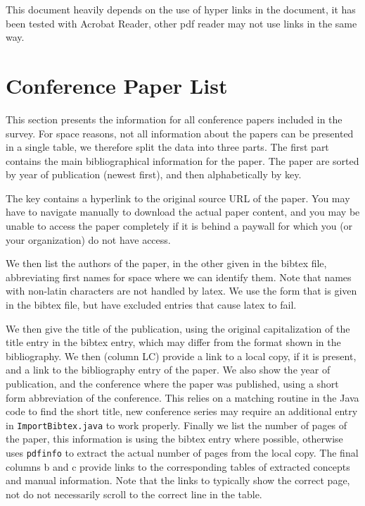 \documentclass[a4paper]{article}
\begin{document}
This document heavily depends on the use of hyper links in the document, it has been tested with Acrobat Reader, other pdf reader may not use links in the same way. 

\clearpage


\section{Conference Paper List}

This section presents the information for all conference papers included in the survey. For space reasons, not all information about the papers can be presented in a single table, we therefore split the data into three parts. The first part contains the main bibliographical information for the paper. The paper are sorted by year of publication (newest first), and then alphabetically by key. 

The key contains a hyperlink to the original source URL of the paper. You may have to navigate manually to download the actual paper content, and you may be unable to access the paper completely if it is behind a paywall for which you (or your organization) do not have access.

We then list the authors of the paper, in the other given in the bibtex file, abbreviating first names for space where we can identify them. Note that names with non-latin characters are not handled by latex. We use the form that is given in the bibtex file, but have excluded entries that cause latex to fail.  

We then give the title of the publication, using the original capitalization of the title entry in the bibtex entry, which may differ from the format shown in the bibliography. We then (column LC) provide a link to a local copy, if it is present, and a link to the bibliography entry of the paper.  We also show the year of publication, and the conference where the paper was published, using a short form abbreviation of the conference. This relies on a matching routine in the Java code to find the short title, new conference series may require an additional entry in \texttt{ImportBibtex.java} to work properly. Finally we list the number of pages of the paper, this information is using the bibtex entry where possible, otherwise uses \texttt{pdfinfo} to extract the actual number of pages from the local copy. The final columns b and c provide links to the corresponding tables of extracted concepts and manual information. Note that the links to typically show the correct page, not do not necessarily scroll to the correct line in the table.
\end{document}
